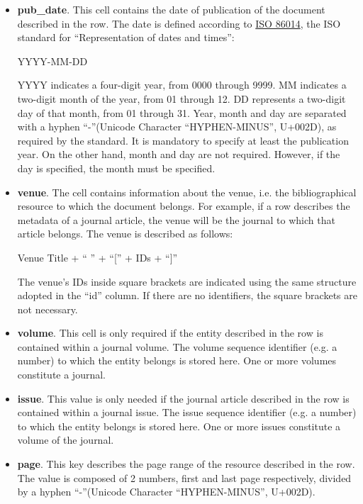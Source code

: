 \documentclass{article}
\begin{document}
\begin{itemize}
  If there are no IDs, there will be no square brackets either. The author's given name is not mandatory. However, the final comma will be present to indicate the incompleteness of this information (e.g. ``Peroni, [orcid:0000-0003-0530- 4305]'')
  \item \textbf{pub\_date}. This cell contains the date of publication of the document described in the row. The date is defined according to \href{https://www.iso.org/iso-8601-date-and-time-format.html}{ISO 86014}, the ISO standard for ``Representation of dates and times'':
  \begin{center}YYYY-MM-DD\end{center}
  YYYY indicates a four-digit year, from 0000 through 9999. MM indicates a two-digit month of the year, from 01 through 12. DD represents a two-digit day of that month, from 01 through 31. Year, month and day are separated with a hyphen ``-''(Unicode Character ``HYPHEN-MINUS'', U+002D), as required by the standard. It is mandatory to specify at least the publication year. On the other hand, month and day are not required. However, if the day is specified, the month must be specified.
  \item \textbf{venue}. The cell contains information about the venue, i.e. the bibliographical resource to which the document belongs. For example, if a row describes the metadata of a journal article, the venue will be the journal to which that article belongs. The venue is described as follows:
  \begin{center}Venue Title + `` '' + ``['' + IDs + ``]''\end{center}
  The venue's IDs inside square brackets are indicated using the same structure adopted in the ``id'' column. If there are no identifiers, the square brackets are not necessary.
  \item \textbf{volume}. This cell is only required if the entity described in the row is contained within a journal volume. The volume sequence identifier (e.g. a number) to which the entity belongs is stored here. One or more volumes constitute a journal.
  \item \textbf{issue}. This value is only needed if the journal article described in the row is contained within a journal issue. The issue sequence identifier (e.g. a number) to which the entity belongs is stored here. One or more issues constitute a volume of the journal.
  \item \textbf{page}. This key describes the page range of the resource described in the row. The value is composed of 2 numbers, first and last page respectively, divided by a hyphen ``-''(Unicode Character ``HYPHEN-MINUS'', U+002D).

\end{itemize}
\end{document}
